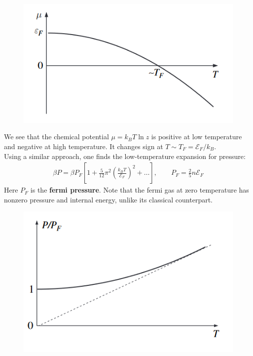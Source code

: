 \documentclass{book}
\theoremstyle{definition}
\newcommand{\be}{\beta}
\newcommand{\f}[2]{\frac{#1}{#2}}
\newcommand{\lp}{\left(}
\newcommand{\rp}{\right)}
\newcommand{\lb}{\left[}
\newcommand{\rb}{\right]}
\begin{document}
\begin{figure}[!htb]
	\centering
	\includegraphics[scale=0.8]{figures/chem_pot_v_T.png}
\end{figure}

We see that the chemical potential $\mu = k_B T \ln z$ is positive at low temperature and negative at high temperature. It changes sign at $T \sim T_F = \mathcal{E}_F/k_B$. \\


Using a similar approach, one finds the low-temperature expansion for pressure:
\begin{align*}
	\be P = \be P_F\lb 1 + \f{5}{12}\pi^2 \lp \f{k_B T}{\mathcal{E}_F} \rp^2 + \dots \rb, \quad\quad \boxed{P_F = \f{2}{5}n \mathcal{E}_F}
\end{align*}
Here $P_F$ is the \textbf{fermi pressure}. Note that the fermi gas at zero temperature has nonzero pressure and internal energy, unlike its classical counterpart. 

\begin{figure}[!htb]
	\centering
	\includegraphics[scale=0.8]{figures/fermi_pressure.png}
\end{figure}
\end{document}
